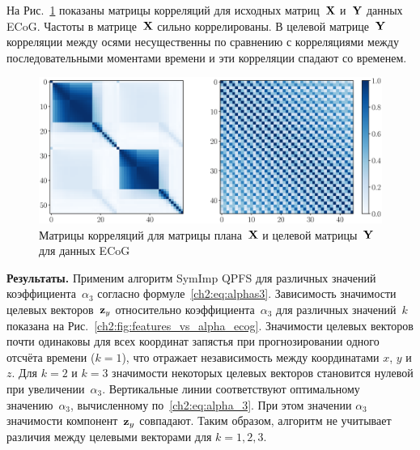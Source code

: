На Рис.~\ref{ch2:fig:corr_matrix} показаны матрицы корреляций для исходных матриц~$\mathbf{X}$ и~$\mathbf{Y}$ данных ECoG. Частоты в матрице~$\mathbf{X}$ сильно коррелированы. 
В целевой матрице~$\mathbf{Y}$ корреляции между осями несущественны по сравнению с корреляциями между последовательными моментами времени и эти корреляции спадают со временем.
\begin{figure}[ht]
	\includegraphics[width=\linewidth]{figs/ch2/corr_matrix}
	\caption{Матрицы корреляций для матрицы плана~$\mathbf{X}$ и целевой матрицы~$\mathbf{Y}$ для данных ECoG}
	\label{ch2:fig:corr_matrix}
\end{figure}

\textbf{Результаты.}
Применим алгоритм SymImp QPFS для различных значений коэффициента~$\alpha_3$ согласно формуле~\eqref{ch2:eq:alphas3}.
Зависимость значимости целевых векторов~$\mathbf{z}_y$ относительно коэффициента~$\alpha_3$ для различных значений~$k$ показана на Рис.~\ref{ch2:fig:features_vs_alpha_ecog}.
Значимости целевых векторов почти одинаковы для всех координат запястья при прогнозировании одного отсчёта времени ($k = 1$), 
что отражает независимость между координатами $x$, $y$ и $z$.
Для $k = 2$ и $k = 3$ значимости некоторых целевых векторов становится нулевой при увеличении~$\alpha_3$.
Вертикальные линии соответствуют оптимальному значению~$\alpha_3$, вычисленному по~\eqref{ch2:eq:alpha_3}. 
При этом значении $\alpha_3$ значимости компонент~$\mathbf{z}_y$ совпадают. 
Таким образом, алгоритм не учитывает различия между целевыми векторами для $k=1, 2, 3$.

